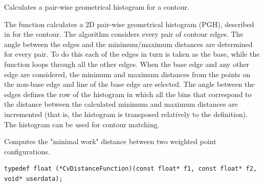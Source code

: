 Calculates a pair-wise geometrical histogram for a contour.


\begin{description}
\end{description}

The function calculates a
2D pair-wise geometrical histogram (PGH), described in
for the contour. The algorithm considers every pair of contour
edges. The angle between the edges and the minimum/maximum distances
are determined for every pair. To do this each of the edges in turn
is taken as the base, while the function loops through all the other
edges. When the base edge and any other edge are considered, the minimum
and maximum distances from the points on the non-base edge and line of
the base edge are selected. The angle between the edges defines the row
of the histogram in which all the bins that correspond to the distance
between the calculated minimum and maximum distances are incremented
(that is, the histogram is transposed relatively to the 
definition). The histogram can be used for contour matching.

Computes the "minimal work" distance between two weighted point configurations.


\begin{lstlisting}
typedef float (*CvDistanceFunction)(const float* f1, const float* f2, void* userdata);
\end{lstlisting}

